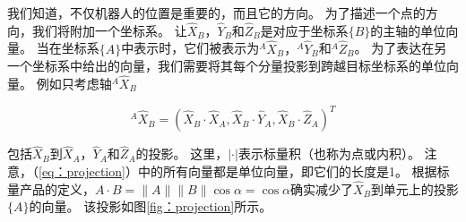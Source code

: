我们知道，不仅机器人的位置是重要的，而且它的方向。 为了描述一个点的方向，我们将附加一个坐标系。 让$ \hat {X} _B，\hat {Y} _B $和$ \hat {Z} _B $是对应于坐标系$ \{B \} $的主轴的单位向量。 当在坐标系$ \{A \} $中表示时，它们被表示为$ ^ A \hat {X} _B，^ A \hat {Y} _B $和$ ^ A \hat {Z} _B $。 为了表达在另一个坐标系中给出的向量，我们需要将其每个分量投影到跨越目标坐标系的单位向量。 例如只考虑轴$ ^ A \hat {X} _B $

\begin{equation}\label{eq:projection}
^A\hat{X}_B=(\hat{X}_B\cdot\hat{X}_A, \hat{X}_B\cdot\hat{Y}_A,\hat{X}_B\cdot\hat{Z}_A)^T
\end{equation}


包括$ \hat {X} _B $到$ \hat {X} _A $，$ \hat {Y} _A $和$ \hat {Z} _A $的投影。 这里，$ | \cdot | $表示标量积（也称为点或内积）。 注意，（\ref {eq：projection}）中的所有向量都是单位向量，即它们的长度是1。 根据标量产品的定义，$ A \cdot B = \| A \| \| B \| \cos \alpha = \cos \alpha $确实减少了$ \hat {X} _B $到单元上的投影 $ \{A \} $的向量。 该投影如图\ref {fig：projection}所示。

